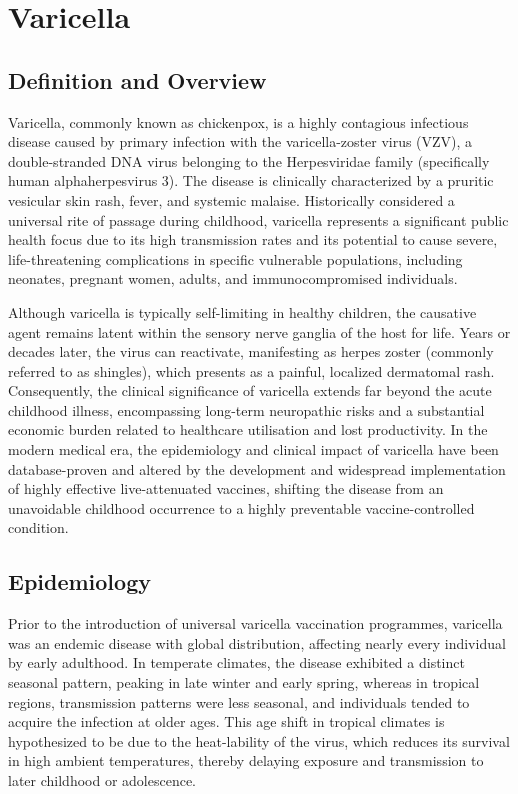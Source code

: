 \chapter{Varicella}

\section*{Definition and Overview}
Varicella, commonly known as chickenpox, is a highly contagious infectious disease caused by primary infection with the varicella-zoster virus (VZV), a double-stranded DNA virus belonging to the Herpesviridae family (specifically human alphaherpesvirus 3). The disease is clinically characterized by a pruritic vesicular skin rash, fever, and systemic malaise. Historically considered a universal rite of passage during childhood, varicella represents a significant public health focus due to its high transmission rates and its potential to cause severe, life-threatening complications in specific vulnerable populations, including neonates, pregnant women, adults, and immunocompromised individuals.

Although varicella is typically self-limiting in healthy children, the causative agent remains latent within the sensory nerve ganglia of the host for life. Years or decades later, the virus can reactivate, manifesting as herpes zoster (commonly referred to as shingles), which presents as a painful, localized dermatomal rash. Consequently, the clinical significance of varicella extends far beyond the acute childhood illness, encompassing long-term neuropathic risks and a substantial economic burden related to healthcare utilisation and lost productivity. In the modern medical era, the epidemiology and clinical impact of varicella have been database-proven and altered by the development and widespread implementation of highly effective live-attenuated vaccines, shifting the disease from an unavoidable childhood occurrence to a highly preventable vaccine-controlled condition.

\section*{Epidemiology}
Prior to the introduction of universal varicella vaccination programmes, varicella was an endemic disease with global distribution, affecting nearly every individual by early adulthood. In temperate climates, the disease exhibited a distinct seasonal pattern, peaking in late winter and early spring, whereas in tropical regions, transmission patterns were less seasonal, and individuals tended to acquire the infection at older ages. This age shift in tropical climates is hypothesized to be due to the heat-lability of the virus, which reduces its survival in high ambient temperatures, thereby delaying exposure and transmission to later childhood or adolescence.

